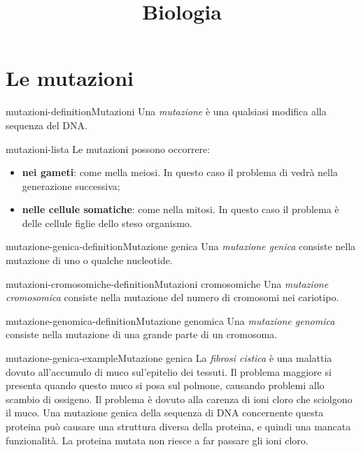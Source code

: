 \documentclass[preview]{standalone}
\begin{document}
\title{Biologia}
\genpage

\section{Le mutazioni}


\begin{snippetdefinition}{mutazioni-definition}{Mutazioni}
    Una \textit{mutazione} è una qualsiasi modifica alla sequenza del DNA.
\end{snippetdefinition}


\begin{snippet}{mutazioni-lista}
    Le mutazioni possono occorrere:
    \begin{itemize}
        \item \textbf{nei gameti}: come mella meiosi.
            In questo caso il problema di vedrà nella generazione successiva;
        \item \textbf{nelle cellule somatiche}: come nella mitosi.
            In questo caso il problema è delle cellule figlie dello steso organismo.
    \end{itemize}
\end{snippet}

\begin{snippetdefinition}{mutazione-genica-definition}{Mutazione genica}
    Una \textit{mutazione genica} consiste nella mutazione
    di uno o qualche nucleotide.
\end{snippetdefinition}

\begin{snippetdefinition}{mutazioni-cromosomiche-definition}{Mutazioni cromosomiche}
    Una \textit{mutazione cromosomica} consiste nella mutazione
    del numero di cromosomi nei cariotipo.
\end{snippetdefinition}

\begin{snippetdefinition}{mutazione-genomica-definition}{Mutazione genomica}
    Una \textit{mutazione genomica} consiste nella mutazione
    di una grande parte di un cromosoma.
\end{snippetdefinition}

\begin{snippetexample}{mutazione-genica-example}{Mutazione genica}
    La \textit{fibrosi cistica} è una malattia dovuto all'accumulo di muco sul'epitelio dei tessuti.
    Il problema maggiore si presenta quando questo muco si posa sul polmone, causando problemi
    allo scambio di ossigeno. Il problema è dovuto alla carenza di ioni cloro che sciolgono il muco.
    Una mutazione genica della sequenza di DNA concernente questa proteina può causare
    una struttura diversa della proteina, e quindi una mancata funzionalità. La proteina mutata
    non riesce a far passare gli ioni cloro.
\end{snippetexample}
\end{document}

